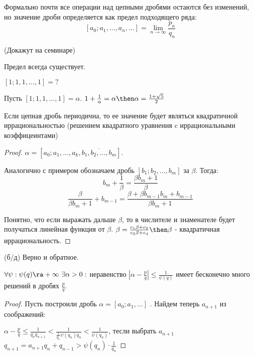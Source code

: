 Формально почти все операции над цепными дробями остаются без изменений, но значение дроби определяется как предел подходящего ряда:
$$[a_0;a_1, \dots, a_n,\dots] = \lim_{n \to \infty}\frac{p_n}{q_n}$$
\begin{theorem}{(Докажут на семинаре)}

    Предел всегда существует.
\end{theorem}

\begin{example} $[1; 1, 1, \dots, 1] = ?$

    Пусть $[1; 1, 1, \dots, 1] = \alpha$. $1 + \frac{1}{\alpha} = \alpha \then \alpha = \frac{1 + \sqrt{5}}{2}$
\end{example}

\begin{theorem}
    Если цепная дробь периодична, то ее значение будет являться квадратичной иррациональностью (решением квадратного уравнения c иррациональными коэффицеинтами)
\end{theorem}

\begin{proof}
    $\alpha = [a_0;a_1, \dots, a_k, \overline{b_1, b_2, \dots, b_m}].$


    Аналогично с примером обозначаем дробь $[b_1; b_2, \dots, b_m]$ за $\beta$. Тогда:
    $$b_m + \frac{1}{\beta} = \frac{\beta b_m + 1}{\beta}$$
    $$\frac{\beta}{\beta b_m + 1} + b_{m - 1} = \frac{\beta + \beta b_{m - 1} b_m + b_{m - 1}}{\beta b_m + 1}$$

    Понятно, что если выражать дальше $\beta$, то в числителе и знаменателе будет получаться линейная функция от $\beta$. $\beta = \frac{c_1 \beta + c_2}{c_3 \beta + c_4} \then \beta$ - квадратичная иррациональность.
\end{proof}

\begin{theorem} {(б/д)}
    Верно и обратное.
\end{theorem}

\begin{theorem}
    \(\forall \psi: \psi(q) \ra +\infty \ \exists \alpha > 0:\) неравенство \(\left|\alpha - \frac{p}{q}\right| \le \frac{1}{\psi(q)}\) имеет бесконечно много решений в дробях \(\frac{p}{q}\).
\end{theorem}
\begin{proof}
   Пусть построили дробь \(\alpha = [a_0; a_1, \dots ]\) . Найдем теперь $a_{n + 1}$ из соображений:
   
   $\alpha - \frac{p}{q} \le \frac{1}{q_n q_{n + 1}} <  \frac{1}{\frac{1}{q_n} \psi(q_n) q_n} < \frac{1}{\psi(q_n)}$, тесли выбрать $a_{n + 1}$ $q_{n + 1} = a_{n + 1}q_n + q_{n - 1} > \psi(q_n) \cdot \frac{1}{q_n}$ 
\end{proof}

